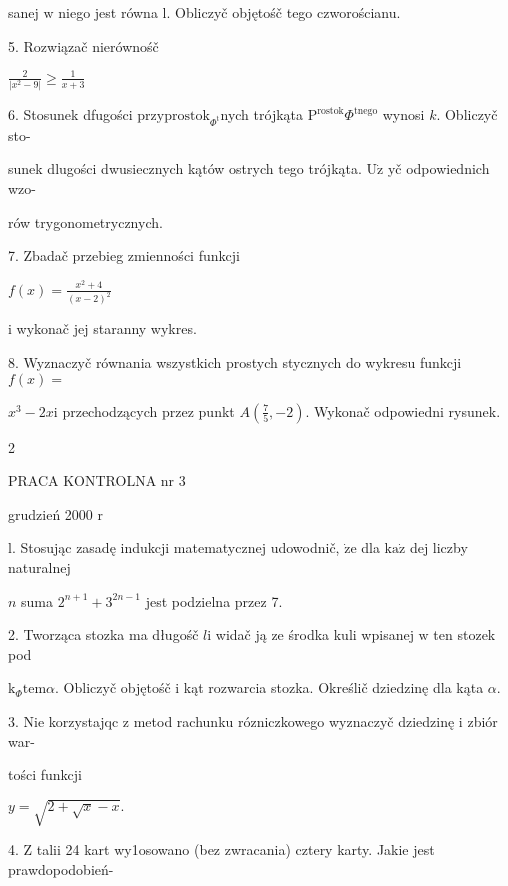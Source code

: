 \documentclass[a4paper,12pt]{article}
\begin{document}
sanej $\mathrm{w}$ niego jest równa l. Obliczyč objętośč tego czworościanu.

5. Rozwiązač nierównośč

$\displaystyle \frac{2}{|x^{2}-9|}\geq\frac{1}{x+3}$

6. Stosunek dfugości $\mathrm{p}\mathrm{r}\mathrm{z}\mathrm{y}\mathrm{p}\mathrm{r}\mathrm{o}\mathrm{s}\mathrm{t}\mathrm{o}\mathrm{k}_{\Phi^{\mathrm{t}}}$nych trójkąta $\mathrm{P}^{\mathrm{r}\mathrm{o}\mathrm{s}\mathrm{t}\mathrm{o}\mathrm{k}}\Phi^{\mathrm{t}\mathrm{n}\mathrm{e}\mathrm{g}\mathrm{o}}$ wynosi $k$. Obliczyč sto-

sunek dlugości dwusiecznych kątów ostrych tego trójkąta. $\mathrm{U}\dot{\mathrm{z}}$ yč odpowiednich wzo-

rów trygonometrycznych.

7. Zbadač przebieg zmienności funkcji

$f(x)=\displaystyle \frac{x^{2}+4}{(x-2)^{2}}$

$\mathrm{i}$ wykonač jej staranny wykres.

8. Wyznaczyč równania wszystkich prostych stycznych do wykresu funkcji $f(x) =$

$x^{3}-2x\mathrm{i}$ przechodzących przez punkt $A(\displaystyle \frac{7}{5},-2)$. Wykonač odpowiedni rysunek.

2





PRACA KONTROLNA nr 3

grudzień 2000 $\mathrm{r}$

l. Stosując zasadę indukcji matematycznej udowodnič, $\dot{\mathrm{z}}\mathrm{e}$ dla $\mathrm{k}\mathrm{a}\dot{\mathrm{z}}$ dej liczby naturalnej

$n$ suma $2^{n+1}+3^{2n-1}$ jest podzielna przez 7.

2. Tworząca stozka ma długośč $l\mathrm{i}$ widač ją ze środka kuli wpisanej $\mathrm{w}$ ten stozek pod

$\mathrm{k}_{\Phi}\mathrm{t}\mathrm{e}\mathrm{m}\alpha$. Obliczyč objętośč $\mathrm{i}$ kąt rozwarcia stozka. Określič dziedzinę dla kąta $\alpha.$

3. Nie korzystajqc $\mathrm{z}$ metod rachunku rózniczkowego wyznaczyč dziedzinę $\mathrm{i}$ zbiór war-

tości funkcji

$y=\sqrt{2+\sqrt{x}-x}.$

4. $\mathrm{Z}$ talii 24 kart wy1osowano (bez zwracania) cztery karty. Jakie jest prawdopodobień-
\end{document}
